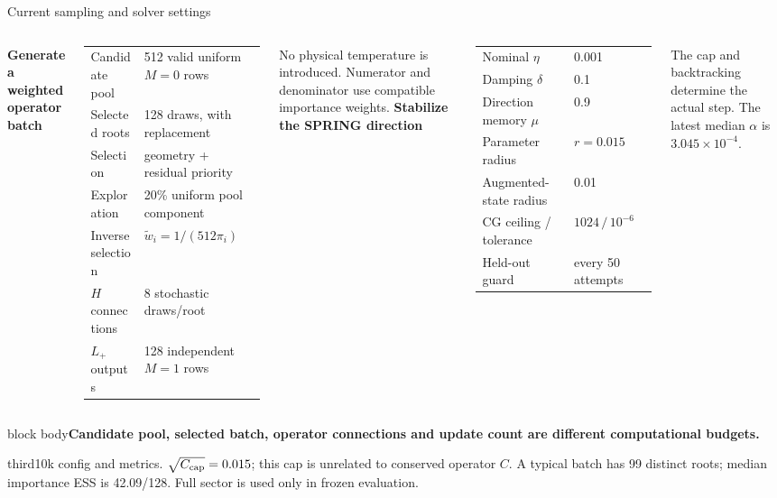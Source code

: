 \documentclass[aspectratio=169,10pt]{beamer}
\newcommand{\src}[1]{\vfill{\fontsize{6.3}{7.5}\selectfont\color{muted}#1\par}}
\newcommand{\take}[1]{\vspace{1mm}\begin{beamercolorbox}[sep=1.6mm,wd=\textwidth]{block body}\small\color{teal}\textbf{#1}\end{beamercolorbox}}
\begin{document}
\begin{frame}{Current sampling and solver settings}
\begin{columns}[T,onlytextwidth]
\textbf{Generate a weighted operator batch}\par\medskip
\small\renewcommand{\arraystretch}{1.12}
\begin{tabular}{@{}ll@{}}\toprule
Candidate pool & 512 valid uniform $M=0$ rows\\
Selected roots & 128 draws, with replacement\\
Selection & geometry + residual priority\\
Exploration & 20\% uniform pool component\\
Inverse selection & $\widetilde w_i=1/(512\pi_i)$\\
$H$ connections & 8 stochastic draws/root\\
$L_+$ outputs & 128 independent $M=1$ rows\\\bottomrule
\end{tabular}
\par\medskip
No physical temperature is introduced. Numerator and denominator use compatible importance weights.
\textbf{Stabilize the SPRING direction}\par\medskip
\small\renewcommand{\arraystretch}{1.12}
\begin{tabular}{@{}ll@{}}\toprule
Nominal $\eta$ & 0.001\\
Damping $\delta$ & 0.1\\
Direction memory $\mu$ & 0.9\\
Parameter radius & $r=0.015$\\
Augmented-state radius & 0.01\\
CG ceiling / tolerance & $1024\,/\,10^{-6}$\\
Held-out guard & every 50 attempts\\\bottomrule
\end{tabular}
\par\medskip
The cap and backtracking determine the actual step. The latest median $\alpha$ is $3.045\times10^{-4}$.
\end{columns}
\take{Candidate pool, selected batch, operator connections and update count are different computational budgets.}
\src{third10k config and metrics. $\sqrt{C_{\rm cap}}=0.015$; this cap is unrelated to conserved operator $C$. A typical batch has 99 distinct roots; median importance ESS is 42.09/128. Full sector is used only in frozen evaluation.}
\end{frame}
\end{document}
